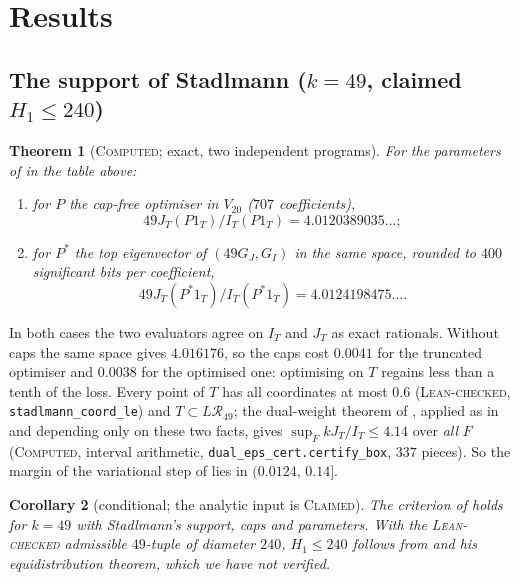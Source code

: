 \documentclass[11pt]{amsart}
\newtheorem{theorem}{Theorem}
\newtheorem{corollary}[theorem]{Corollary}
\theoremstyle{definition}
\theoremstyle{remark}
\newcommand{\lbl}[1]{\textup{\textsc{#1}}}
\newcommand{\R}{\mathcal{R}}
\begin{document}
\section{Results}

\subsection*{The support of Stadlmann ($k=49$, claimed $H_1\le240$)}

\begin{theorem}[\lbl{Computed}; exact, two independent programs]\label{thm:240}
For the parameters of \cite{Sta26} in the table above:
\begin{enumerate}
\item for $P$ the cap-free optimiser in $V_{20}$ ($707$ coefficients),
\[49J_T(P1_T)/I_T(P1_T)=4.0120389035\ldots;\]
\item for $P^\ast$ the top eigenvector of $(49G_J,G_I)$ in the same space,
rounded to $400$ significant bits per coefficient,
\[49J_T(P^\ast1_T)/I_T(P^\ast1_T)=4.0124198475\ldots.\]
\end{enumerate}
\end{theorem}

In both cases the two evaluators agree on $I_T$ and $J_T$ as exact rationals.
Without caps the same space gives $4.016176$, so the caps cost $0.0041$ for the
truncated optimiser and $0.0038$ for the optimised one: optimising on $T$
regains less than a tenth of the loss. Every point of $T$ has all
coordinates at most $0.6$ (\lbl{Lean-checked}, \texttt{stadlmann\_coord\_le})
and $T\subset L\R_{49}$; the dual-weight theorem of \cite[\S4]{Kim26},
applied as in \cite[\S5]{Kim26} and depending only on these two facts, gives
$\sup_FkJ_T/I_T\le4.14$ over \emph{all} $F$ (\lbl{Computed}, interval
arithmetic, \texttt{dual\_eps\_cert.certify\_box}, $337$ pieces). So the
margin of the variational step of \cite{Sta26} lies in $(0.0124,\,0.14]$.

\begin{corollary}[conditional; the analytic input is \lbl{Claimed}]
The criterion of \cite[Prop.~1]{Sta26} holds for $k=49$ with Stadlmann's
support, caps and parameters. With the \lbl{Lean-checked} admissible
$49$-tuple of diameter $240$, $H_1\le240$ follows from \cite[Prop.~1]{Sta26}
and his equidistribution theorem, which we have not verified.
\end{corollary}
\end{document}
